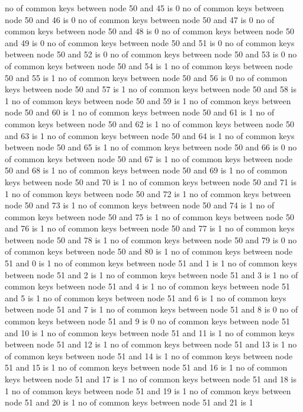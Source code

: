 no of common keys between node 50 and 45 is 0
no of common keys between node 50 and 46 is 0
no of common keys between node 50 and 47 is 0
no of common keys between node 50 and 48 is 0
no of common keys between node 50 and 49 is 0
no of common keys between node 50 and 51 is 0
no of common keys between node 50 and 52 is 0
no of common keys between node 50 and 53 is 0
no of common keys between node 50 and 54 is 1
no of common keys between node 50 and 55 is 1
no of common keys between node 50 and 56 is 0
no of common keys between node 50 and 57 is 1
no of common keys between node 50 and 58 is 1
no of common keys between node 50 and 59 is 1
no of common keys between node 50 and 60 is 1
no of common keys between node 50 and 61 is 1
no of common keys between node 50 and 62 is 1
no of common keys between node 50 and 63 is 1
no of common keys between node 50 and 64 is 1
no of common keys between node 50 and 65 is 1
no of common keys between node 50 and 66 is 0
no of common keys between node 50 and 67 is 1
no of common keys between node 50 and 68 is 1
no of common keys between node 50 and 69 is 1
no of common keys between node 50 and 70 is 1
no of common keys between node 50 and 71 is 1
no of common keys between node 50 and 72 is 1
no of common keys between node 50 and 73 is 1
no of common keys between node 50 and 74 is 1
no of common keys between node 50 and 75 is 1
no of common keys between node 50 and 76 is 1
no of common keys between node 50 and 77 is 1
no of common keys between node 50 and 78 is 1
no of common keys between node 50 and 79 is 0
no of common keys between node 50 and 80 is 1
no of common keys between node 51 and 0 is 1
no of common keys between node 51 and 1 is 1
no of common keys between node 51 and 2 is 1
no of common keys between node 51 and 3 is 1
no of common keys between node 51 and 4 is 1
no of common keys between node 51 and 5 is 1
no of common keys between node 51 and 6 is 1
no of common keys between node 51 and 7 is 1
no of common keys between node 51 and 8 is 0
no of common keys between node 51 and 9 is 0
no of common keys between node 51 and 10 is 1
no of common keys between node 51 and 11 is 1
no of common keys between node 51 and 12 is 1
no of common keys between node 51 and 13 is 1
no of common keys between node 51 and 14 is 1
no of common keys between node 51 and 15 is 1
no of common keys between node 51 and 16 is 1
no of common keys between node 51 and 17 is 1
no of common keys between node 51 and 18 is 1
no of common keys between node 51 and 19 is 1
no of common keys between node 51 and 20 is 1
no of common keys between node 51 and 21 is 1
